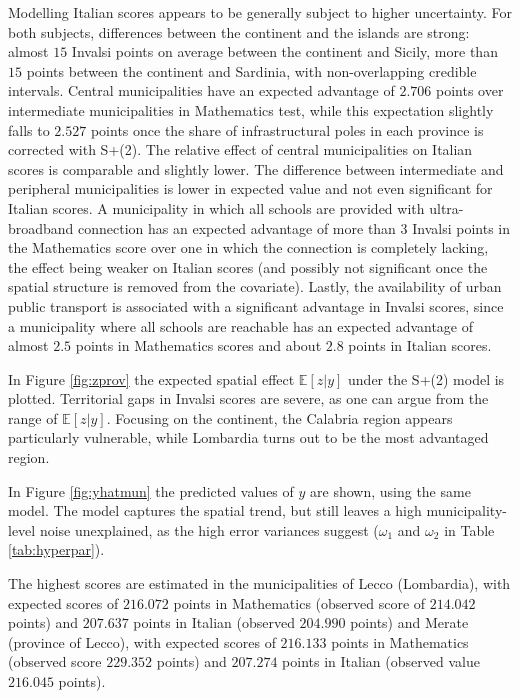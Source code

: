 \documentclass[openany]{book}
\begin{document}
Modelling Italian scores appears to be generally subject to higher uncertainty. For both subjects, differences between the continent and the islands are strong: almost $15$ Invalsi points on average between the continent and Sicily, more than $15$ points between the continent and Sardinia, with non-overlapping credible intervals. Central municipalities have an expected advantage of $2.706$ points over intermediate municipalities in Mathematics test, while this expectation slightly falls to $2.527$ points once the share of infrastructural poles in each province is corrected with S+(2). The relative effect of central municipalities on Italian scores is comparable and slightly lower. The difference between intermediate and peripheral municipalities is lower in expected value and not even significant for Italian scores. A municipality in which all schools are provided with ultra-broadband connection has an expected advantage of more than $3$ Invalsi points in the Mathematics score over one in which the connection is completely lacking, the effect being weaker on Italian scores (and possibly not significant once the spatial structure is removed from the covariate). Lastly, the availability of urban public transport is associated with a significant advantage in Invalsi scores, since a municipality where all schools are reachable has an expected advantage of almost $2.5$ points in Mathematics scores and about $2.8$ points in Italian scores. 

In Figure \ref {fig:zprov} the expected spatial effect $\mathbb{E}[z|y]$ under the S+(2) model is plotted. %
Territorial gaps in Invalsi scores are severe, as one can argue from the range of $\mathbb{E}[z|y]$. Focusing on the continent, the Calabria region appears particularly vulnerable, while Lombardia turns out to be the most advantaged region. 

In Figure \ref{fig:yhatmun} the predicted values of $y$ are shown, using the same model. The model captures the spatial trend, but still leaves a high municipality-level noise unexplained, as the high error variances suggest ($\omega_1$ and $\omega_2$ in Table \ref{tab:hyperpar}). 

The highest scores are estimated in the municipalities of Lecco (Lombardia), with expected scores of $216.072$ points in Mathematics (observed score of $214.042$ points) and $207.637$ points in Italian (observed $204.990$ points) and Merate (province of Lecco), with expected scores of $216.133$ points in Mathematics (observed score $229.352$ points) and $207.274$ points in Italian (observed value $216.045$ points). 
\end{document}
